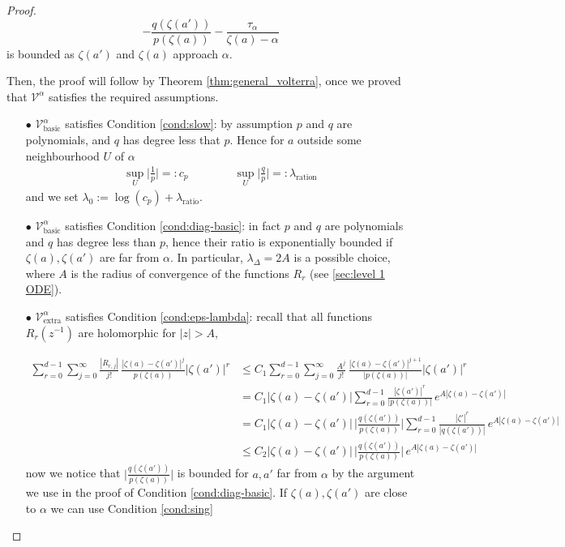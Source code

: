 \documentclass{article}
\theoremstyle{plain}
\newcommand{\volterra}{\mathcal{V}}
\newcommand{\hardpart}{\mathcal{V}_\text{basic}}
\newcommand{\softpart}{\mathcal{V}_\text{extra}}
\begin{document}
\begin{proof}
\begin{equation*}
    -\frac{q(\zeta(a'))}{p(\zeta(a))}-\frac{\tau_\alpha}{\zeta(a)-\alpha}
\end{equation*}
is bounded as $\zeta(a')$ and $\zeta(a)$ approach $\alpha$. 

Then, the proof will follow by Theorem \ref{thm:general_volterra}, once we proved that $\volterra^\alpha$ satisfies the required assumptions.  

\begin{enumerate}
    \item[$\bullet$] $\hardpart^\alpha$ satisfies Condition \eqref{cond:slow}: by assumption $p$ and $q$ are polynomials, and $q$ has degree less that $p$. Hence for $a$ outside some neighbourhood $U$ of $\alpha$  
\begin{align*}
    \sup_U \Big\vert \frac{1}{p}\Big\vert =:c_p \qquad\qquad \sup_U \Big\vert\frac{q}{p}\Big\vert =:\lambda_\text{ration} 
\end{align*}
    and we set $\lambda_0:=\log(c_p)+\lambda_\text{ratio}$. 
    \item[$\bullet$] $\hardpart^\alpha$ satisfies Condition \eqref{cond:diag-basic}: in fact $p$ and $q$ are polynomials and $q$ has degree less than $p$, hence their ratio is exponentially bounded if $\zeta(a), \zeta(a')$ are far from $\alpha$. In particular, $\lambda_\Delta=2A$ is a possible choice, where $A$ is the radius of convergence of the functions $R_r$ (see \ref{sec:level 1 ODE}).    
    \item[$\bullet$]  $\softpart^\alpha$ satisfies Condition \eqref{cond:eps-lambda}: recall that all functions $R_r(z^{-1})$ are holomorphic for $|z|>A$, 

    \begin{align*}
        \sum_{r=0}^{d-1}\sum_{j=0}^\infty \frac{| R_{r,j}|}{j!} \, \frac{|\zeta(a)-\zeta(a')|^j}{p(\zeta(a))}|\zeta(a')|^r  &\leq C_1 \sum_{r=0}^{d-1}\sum_{j=0}^\infty \frac{A^j}{j!} \, \frac{|\zeta(a)-\zeta(a')|^{j+1}}{|p(\zeta(a))|}|\zeta(a')|^r \\
        & =C_1 |\zeta(a)-\zeta(a')| \sum_{r=0}^{d-1} \frac{|\zeta(a')|^r}{|p(\zeta(a))|}\,  e^{A |\zeta(a)-\zeta(a')|}\\
        &=C_1 |\zeta(a)-\zeta(a')| \, \Big\vert \frac{q(\zeta(a'))}{p(\zeta(a))}\Big\vert \sum_{r=0}^{d-1} \frac{|\zeta'|^r}{|q(\zeta(a'))|} \, e^{A |\zeta(a)-\zeta(a')|}\\
        &\leq C_2 |\zeta(a)-\zeta(a')| \, \Big\vert \frac{q(\zeta(a'))}{p(\zeta(a))}\Big\vert \,  e^{A |\zeta(a)-\zeta(a')|}
    \end{align*}
now we notice that $\Big\vert \frac{q(\zeta(a'))}{p(\zeta(a))}\Big\vert$ is bounded for $a,a'$ far from $\alpha$ by the argument we use in the proof of Condition \eqref{cond:diag-basic}. If $\zeta(a), \zeta(a')$ are close to $\alpha$ we can use Condition \eqref{cond:sing}


\end{enumerate}
\end{proof}
\end{document}
